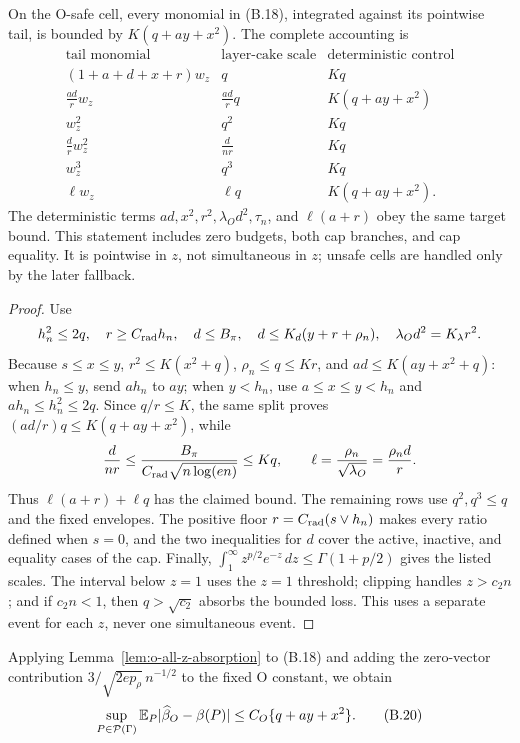 \begin{lemma}
\label{lem:o-all-z-absorption}
On the O-safe cell, every monomial in (B.18), integrated against its
pointwise tail, is bounded by \(K(q+ay+x^2)\).  The complete accounting is
\[
\begin{array}{c|c|c}
\text{tail monomial}&\text{layer-cake scale}&\text{deterministic control}\\ \hline
(1+a+d+x+r)w_z&q&Kq\\
\frac{ad}{r}w_z&\frac{ad}{r}q&K(q+ay+x^2)\\
w_z^2&q^2&Kq\\
\frac d r w_z^2&\frac d{nr}&Kq\\
w_z^3&q^3&Kq\\
\ell w_z&\ell q&K(q+ay+x^2).
\end{array}
\tag{B.19}
\]
The deterministic terms \(ad,x^2,r^2,\lambda_Od^2,\tau_n\), and
\(\ell(a+r)\) obey the same target bound.  This statement includes zero
budgets, both cap branches, and cap equality.  It is pointwise in \(z\), not
simultaneous in \(z\); unsafe cells are handled only by the later fallback.
\end{lemma}
\begin{proof}
Use
\[
 h_n^2\le2q,\quad r\ge C_{\rm rad}h_n,\quad
 d\le B_\pi,\quad d\le K_d(y+r+\rho_n),\quad
 \lambda_Od^2=K_\lambda r^2.
\]
Because \(s\le x\le y\), \(r^2\le K(x^2+q)\),
\(\rho_n\le q\le Kr\), and \(ad\le K(ay+x^2+q)\): when
\(h_n\le y\), send \(ah_n\) to \(ay\); when \(y<h_n\), use
\(a\le x\le y<h_n\) and \(ah_n\le h_n^2\le2q\).
Since \(q/r\le K\), the same split proves
\((ad/r)q\le K(q+ay+x^2)\), while
\[
 \frac d{nr}\le
 \frac{B_\pi}{C_{\rm rad}\sqrt{n\log(en)}}\le Kq,\qquad
 \ell=\frac{\rho_n}{\sqrt{\lambda_O}}
 =\frac{\rho_nd}{r}.
\]
Thus \(\ell(a+r)+\ell q\) has the claimed bound.  The remaining rows use
\(q^2,q^3\le q\) and the fixed envelopes.  The positive floor
\(r=C_{\rm rad}(s\vee h_n)\) makes every ratio defined when \(s=0\), and
the two inequalities for \(d\) cover the active, inactive, and equality
cases of the cap.  Finally,
\(\int_1^\infty z^{p/2}e^{-z}\,dz\le\Gamma(1+p/2)\) gives the listed
scales.  The interval below \(z=1\) uses the \(z=1\) threshold; clipping
handles \(z>c_2n\); and if \(c_2n<1\), then \(q>\sqrt{c_2}\) absorbs the
bounded loss.  This uses a separate event for each \(z\), never one
simultaneous event.
\end{proof}

Applying Lemma~\ref{lem:o-all-z-absorption} to (B.18) and adding the zero-vector contribution
\(3/\sqrt{2ep_\rho}\,n^{-1/2}\) to the fixed O constant, we obtain
\begin{equation}
 \sup_{P\in\mathcal P(\Gamma)}
 \mathbb E_P\lvert \widehat\beta_O-\beta(P)\rvert
 \le C_O\{q+ay+x^2\}.
 \tag{B.20}
\end{equation}


